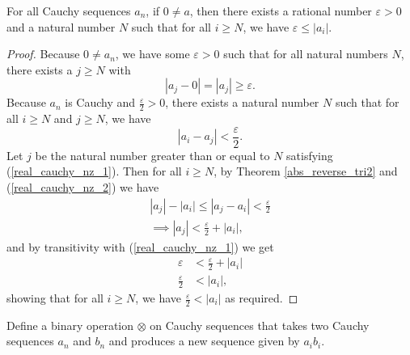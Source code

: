 \documentclass[../../math.tex]{subfiles}
\begin{document}
\begin{lemma} \label{real_cauchy_nz}
    For all Cauchy sequences $a_n$, if $0 \neq a$, then there exists a rational
    number $\varepsilon > 0$ and a natural number $N$ such that for all $i \geq
    N$, we have $\varepsilon \leq |a_i|$.
\end{lemma}
\begin{proof}
    Because $0 \neq a_n$, we have some $\varepsilon > 0$ such that for all
    natural numbers $N$, there exists a $j \geq N$ with
    \begin{equation} \label{real_cauchy_nz_1}
        |a_j - 0| = |a_j| \geq \varepsilon.
    \end{equation}
    Because $a_n$ is Cauchy and $\frac{\varepsilon}{2} > 0$, there exists a
    natural number $N$ such that for all $i \geq N$ and $j \geq N$, we have
    \begin{equation} \label{real_cauchy_nz_2}
        |a_i - a_j| < \frac{\varepsilon}{2}.
    \end{equation}
    Let $j$ be the natural number greater than or equal to $N$ satisfying
    (\ref{real_cauchy_nz_1}).  Then for all $i \geq N$, by Theorem
    \ref{abs_reverse_tri2} and (\ref{real_cauchy_nz_2}) we have
    \begin{gather*}
        |a_j| - |a_i| \leq |a_j - a_i| < \frac{\varepsilon}{2} \\
        \implies |a_j| < \frac{\varepsilon}{2} + |a_i|,
    \end{gather*}
    and by transitivity with (\ref{real_cauchy_nz_1}) we get
    \begin{align*}
        \varepsilon &< \frac{\varepsilon}{2} + |a_i| \\
        \frac{\varepsilon}{2} &< |a_i|,
    \end{align*}
    showing that for all $i \geq N$, we have $\frac{\varepsilon}{2} < |a_i|$ as
    required.
\end{proof}

\begin{definition}
    Define a binary operation $\otimes$ on Cauchy sequences that takes two
    Cauchy sequences $a_n$ and $b_n$ and produces a new sequence given by $a_i
    b_i$.
\end{definition}
\end{document}
